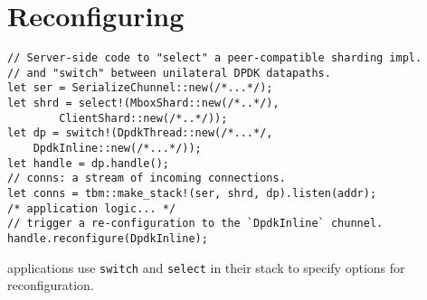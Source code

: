 \section{Reconfiguring \tunnels}\label{s:reconfig}
\begin{listing}[t]
\begin{verbatim}
// Server-side code to "select" a peer-compatible sharding impl.
// and "switch" between unilateral DPDK datapaths. 
let ser = SerializeChunnel::new(/*...*/);
let shrd = select!(MboxShard::new(/*..*/), 
        ClientShard::new(/*..*/));
let dp = switch!(DpdkThread::new(/*...*/,
    DpdkInline::new(/*...*/));
let handle = dp.handle();
// conns: a stream of incoming connections.
let conns = tbm::make_stack!(ser, shrd, dp).listen(addr);
/* application logic... */
// trigger a re-configuration to the `DpdkInline` chunnel.
handle.reconfigure(DpdkInline);
\end{verbatim}
\caption{\name applications use \texttt{switch} and \texttt{select} in their \tunnel stack to specify options for reconfiguration.}\label{l:select}
\end{listing}
%
%
